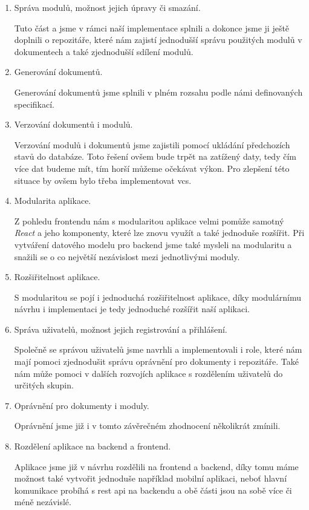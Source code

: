 \begin{enumerate}
    \item Správa modulů, možnost jejich úpravy či smazání.

          Tuto část a jsme v rámci naší implementace splnili a dokonce jsme ji ještě doplnili o repozitáře,
          které nám zajistí jednodušší správu použitých modulů v dokumentech a také zjednodušší sdílení
          modulů.
    \item Generování dokumentů.

          Generování dokumentů jsme splnili v plném rozsahu podle námi definovaných specifikací.
    \item Verzování dokumentů i modulů.

          Verzování modulů i dokumentů jsme zajistili pomocí ukládání předcho\-zích stavů do databáze. Toto řešení
          ovšem bude trpět na zatížený daty, tedy čím více dat budeme mít, tím horší můžeme očekávat výkon. Pro zlepšení
          této situace by ovšem bylo třeba implementovat \gls{vcs}.
    \item Modularita aplikace.

         Z pohledu frontendu nám s modularitou aplikace velmi pomůže samotný \textit{React} a jeho komponenty, které lze znovu využít
         a také jednoduše rozšířit. Při vytváření datového modelu pro backend jsme také mysleli na modularitu a snažili se o co
         největší nezávislost mezi jednotlivými moduly.
    \item Rozšiřitelnost aplikace.

          S modularitou se pojí i jednoduchá rozšiřitelnost aplikace, díky modulárnímu návrhu i implementaci je tedy jednoduché
          rozšířit naší aplikaci.
    \item Správa uživatelů, možnost jejich registrování a přihlášení.

          Společně se správou uživatelů jsme navrhli a implementovali i role, které nám mají pomoci zjednodušit správu oprávnění
          pro dokumenty i repozitáře. Také nám může pomoci v dalších rozvojích aplikace s rozdělením uživatelů do určitých skupin.

    \item Oprávnění pro dokumenty i moduly.

          Oprávnění jsme již i v tomto závěrečném zhodnocení několikrát zmínili.
    \item Rozdělení aplikace na backend a frontend.

          Aplikace jsme již v návrhu rozdělili na frontend a backend, díky tomu máme možnost také vytvořit jednoduše například mobilní
          aplikaci, neboť hlavní komunikace probíhá s \gls{rest} \gls{api} na backendu a obě části jsou na sobě více či méně nezávislé.
\end{enumerate}